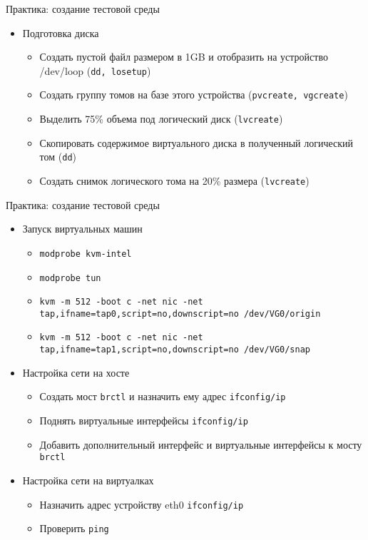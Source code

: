 \begin{frame}{Практика: создание тестовой среды}
	\begin{itemize}
		\item Подготовка диска
			\begin{itemize}
				\item Создать пустой файл размером в 1GB и отобразить на устройство
					/dev/loop ({\tt dd, losetup})
				\item Создать группу томов на базе этого устройства ({\tt pvcreate, vgcreate})
				\item Выделить 75\% объема под логический диск ({\tt lvcreate})
				\item Скопировать содержимое виртуального диска в полученный логический том ({\tt dd})
				\item Создать снимок логического тома на 20\% размера ({\tt lvcreate})
			\end{itemize}
	\end{itemize}
\end{frame}

\begin{frame}{Практика: создание тестовой среды}
	\begin{itemize}
		\item Запуск виртуальных машин
			\begin{itemize}
				\item {\tt modprobe kvm-intel} 
				\item {\tt modprobe tun} 
				\item {\tt kvm -m 512 -boot c -net nic -net tap,ifname=tap0,script=no,downscript=no /dev/VG0/origin } 
				\item {\tt kvm -m 512 -boot c -net nic -net tap,ifname=tap1,script=no,downscript=no /dev/VG0/snap } 
			\end{itemize}
			\pause
		\item Настройка сети на хосте
			\begin{itemize}
				\item Создать мост {\tt brctl} и назначить ему адрес {\tt ifconfig/ip}
				\item Поднять виртуальные интерфейсы {\tt ifconfig/ip}
				\item Добавить дополнительный интерфейс и виртуальные интерфейсы к мосту {\tt brctl}
			\end{itemize}
			\pause
		\item Настройка сети на виртуалках
			\begin{itemize}
				\item Назначить адрес устройству eth0 {\tt ifconfig/ip}
				\item Проверить {\tt ping}
			\end{itemize}

	\end{itemize}
\end{frame}



